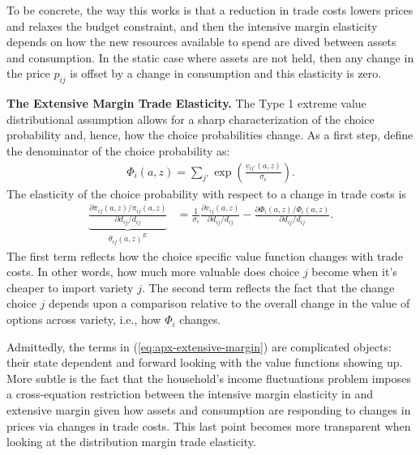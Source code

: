 \documentclass[12pt,pdftex]{article}
\begin{document}
\begin{onehalfspacing}
To be concrete, the way this works is that a reduction in trade costs lowers prices and relaxes the budget constraint, and then the intensive margin elasticity depends on how the new resources available to spend are dived between assets and consumption. In the static case where assets are not held, then any change in the price $p_{ij}$ is offset by a change in consumption and this elasticity is zero.

\textbf{The Extensive Margin Trade Elasticity.} The Type 1 extreme value distributional assumption allows for a sharp characterization of the choice probability and, hence, how the choice probabilities change. As a first step, define the denominator of the choice probability as:
\begin{align}
\Phi_{i}(a,z) = \sum_{j'} \exp \left( \frac{ v_{ij'}(a, z) }{\sigma_{\epsilon}} \right).
\end{align}
The elasticity of the choice probability with respect to a change in trade costs is
\begin{align}
\underbrace{ \frac{\partial \pi_{ij}(a,z) / \pi_{ij}(a,z)}{\partial d_{ij} / d_{ij}} }_{\theta_{ij}(a,z)^{E}} &= \frac{1}{\sigma_{\epsilon}}\frac{\partial v_{ij}(a,z)}{\partial d_{ij}/d_{ij}} -  \frac{\partial \Phi_{i}(a,z) / \Phi_{i}(a,z)}{\partial d_{ij}/d_{ij}}.
\label{eq:apx-extensive-margin}
\end{align}
The first term reflects how the choice specific value function changes with trade costs. In other words, how much more valuable does choice $j$ become when it's cheaper to import variety $j$. The second term reflects the fact that the change choice $j$ depends upon a comparison relative to the overall change in the value of options across variety, i.e., how $\Phi_{i}$ changes.

Admittedly, the terms in (\ref{eq:apx-extensive-margin}) are complicated objects: their state dependent and forward looking with the value functions showing up. More subtle is the fact that the household's income fluctuations problem imposes a cross-equation restriction between the intensive margin elasticity in and extensive margin given how assets and consumption are responding to changes in prices via changes in trade costs. This last point becomes more transparent when looking at the distribution margin trade elasticity.


\end{onehalfspacing}
\end{document}
